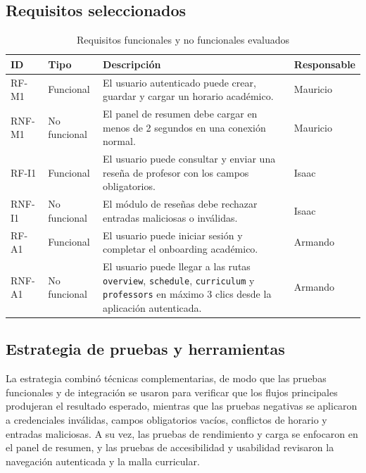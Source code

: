 \documentclass[11pt,spanish]{article}
\begin{document}
\subsection{Requisitos seleccionados}

\begin{table}[H]
\centering
\caption{Requisitos funcionales y no funcionales evaluados}
\label{tab:requisitos}
\begin{tabularx}{\textwidth}{p{1.8cm} p{2.4cm} Y p{2.5cm}}
\toprule
\textbf{ID} & \textbf{Tipo} & \textbf{Descripción} & \textbf{Responsable} \\
\midrule
RF-M1 & Funcional & El usuario autenticado puede crear, guardar y cargar un horario académico. & Mauricio \\
RNF-M1 & No funcional & El panel de resumen debe cargar en menos de 2 segundos en una conexión normal. & Mauricio \\
RF-I1 & Funcional & El usuario puede consultar y enviar una reseña de profesor con los campos obligatorios. & Isaac \\
RNF-I1 & No funcional & El módulo de reseñas debe rechazar entradas maliciosas o inválidas. & Isaac \\
RF-A1 & Funcional & El usuario puede iniciar sesión y completar el onboarding académico. & Armando \\
RNF-A1 & No funcional & El usuario puede llegar a las rutas \texttt{overview}, \texttt{schedule}, \texttt{curriculum} y \texttt{professors} en máximo 3 clics desde la aplicación autenticada. & Armando \\
\bottomrule
\end{tabularx}
\end{table}

\subsection{Estrategia de pruebas y herramientas}

La estrategia combinó técnicas complementarias, de modo que las pruebas funcionales y de integración se usaron para verificar que los flujos principales produjeran el resultado esperado, mientras que las pruebas negativas se aplicaron a credenciales inválidas, campos obligatorios vacíos, conflictos de horario y entradas maliciosas. A su vez, las pruebas de rendimiento y carga se enfocaron en el panel de resumen, y las pruebas de accesibilidad y usabilidad revisaron la navegación autenticada y la malla curricular.
\end{document}
